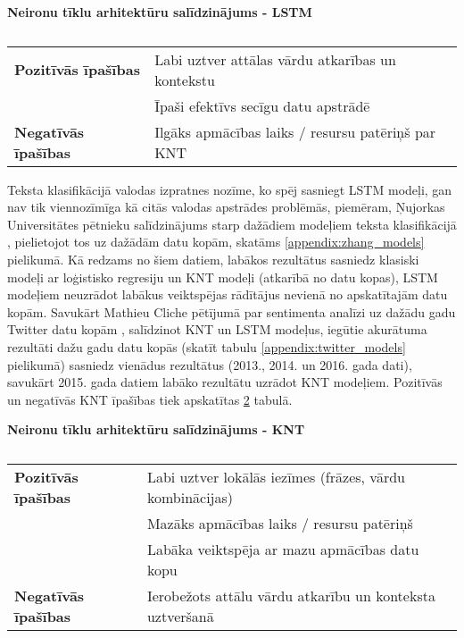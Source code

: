 \begin{table}[H]
\centering
\caption{\label{tab:neironu_tiklu_arhitekturas_lstm}}
\textbf{Neironu tīklu arhitektūru salīdzinājums - LSTM\\}
\begin{tabular}{| m{5cm} | m{10cm} |}
\hline
\textbf{Pozitīvās īpašības} & 
Labi uztver attālas vārdu atkarības un kontekstu \\ 
\cline{2-2}
 & Īpaši efektīvs secīgu datu apstrādē \\ 
\hline
\textbf{Negatīvās īpašības} & 
Ilgāks apmācības laiks / resursu patēriņš par KNT\\ 
\hline
\end{tabular}
\end{table}

Teksta klasifikācijā valodas izpratnes nozīme, ko spēj sasniegt LSTM modeļi, gan nav tik viennozīmīga kā citās valodas apstrādes problēmās, piemēram, Ņujorkas Universitātes pētnieku salīdzinājums starp dažādiem modeļiem teksta klasifikācijā \cite{zhang2015characterlevel}, pielietojot tos uz dažādām datu kopām, skatāms \ref{appendix:zhang_models} pielikumā. Kā redzams no šiem datiem, labākos rezultātus sasniedz klasiski modeļi ar loģistisko regresiju un KNT modeļi (atkarībā no datu kopas), LSTM modeļiem neuzrādot labākus veiktspējas rādītājus nevienā no apskatītajām datu kopām. Savukārt Mathieu Cliche pētījumā par sentimenta analīzi uz dažādu gadu Twitter datu kopām \cite{cliche-2017-bb}, salīdzinot KNT un LSTM modeļus, iegūtie akurātuma rezultāti dažu gadu datu kopās (skatīt tabulu \ref{appendix:twitter_models} pielikumā) sasniedz vienādus rezultātus (2013., 2014. un  2016. gada dati), savukārt 2015. gada datiem labāko rezultātu uzrādot KNT modeļiem. Pozitīvās un negatīvās KNT īpašības tiek apskatītas \ref{tab:neironu_tiklu_arhitekturas_knt} tabulā.

\begin{table}[H]
\centering
\caption{\label{tab:neironu_tiklu_arhitekturas_knt}}
\textbf{Neironu tīklu arhitektūru salīdzinājums - KNT\\}
\begin{tabular}{| m{5cm} | m{10cm} |}
\hline
\textbf{Pozitīvās īpašības} & 
Labi uztver lokālās iezīmes (frāzes, vārdu kombinācijas) \\ 
\cline{2-2}
 & Mazāks apmācības laiks / resursu patēriņš \\ 
\cline{2-2}
 & Labāka veiktspēja ar mazu apmācības datu kopu \\ 
\hline
\textbf{Negatīvās īpašības} & 
Ierobežots attālu vārdu atkarību un konteksta uztveršanā \\ 
\hline
\end{tabular}
\end{table}

